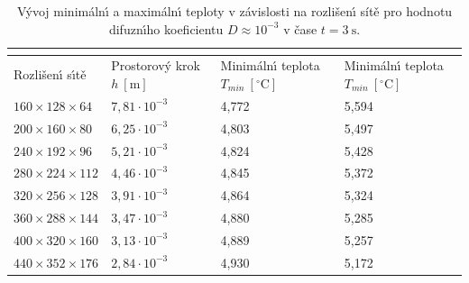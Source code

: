             \begin{table}[H]
                \centering
                \begin{tabular}{p{}p{}p{}p{}}
                    \toprule
                    \multicolumn{4}{c}{\centering{$t=5.0 \ \mathrm{s}$}} \\ \midrule
                    Rozli\v{s}en\'{\i} s\'{\i}t\v{e} & \multicolumn{1}{p{2.5cm}}{Prostorov\'{y} krok $h \ [\mathrm{m}]$} & \multicolumn{1}{p{2.8cm}}{Minim\'{a}ln\'{\i} teplota $T_{min} \ [^\circ\mathrm{C}]$} & \multicolumn{1}{p{2.8cm}}{Minim\'{a}ln\'{\i} teplota $T_{min} \ [^\circ\mathrm{C}]$} \\ \midrule
                    $160 \times 128 \times 64$  & $7,81 \cdot  10^{-3}$ & 4,772 & 5,594 \\
                    $200 \times 160 \times 80$  & $6,25 \cdot  10^{-3}$ & 4,803 & 5,497 \\
                    $240 \times 192 \times 96$  & $5,21 \cdot  10^{-3}$ & 4,824 & 5,428 \\
                    $280 \times 224 \times 112$  & $4,46 \cdot  10^{-3}$ & 4,845 & 5,372 \\
                    $320 \times 256 \times 128$  & $3,91 \cdot  10^{-3}$ & 4,864 & 5,324 \\
                    $360 \times 288 \times 144$  & $3,47 \cdot  10^{-3}$ & 4,880 & 5,285 \\
                    $400 \times 320 \times 160$  & $3,13 \cdot  10^{-3}$ & 4,889 & 5,257 \\
                    $440 \times 352 \times 176$  & $2,84 \cdot  10^{-3}$ & 4,930 & 5,172 \\ \bottomrule
                \end{tabular}
                \caption{V\'{y}voj minim\'{a}ln\'{\i} a maxim\'{a}ln\'{\i} teploty v z\'{a}vislosti na rozli\v{s}en\'{\i} s\'{i}t\v{e} pro hodnotu difuzn\'{\i}ho koeficientu $D \approx 10^{-3}$ v \v{c}ase $t = 3 \ \mathrm{s}$.}
                \label{table:D10m3_5}
            \end{table}


